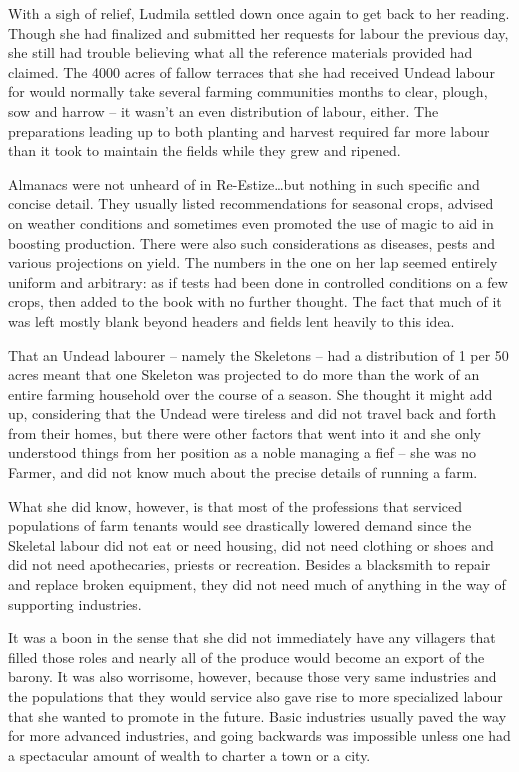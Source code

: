  

With a sigh of relief, Ludmila settled down once again to get back to her reading. Though she had finalized and submitted her requests for labour the previous day, she still had trouble believing what all the reference materials provided had claimed. The 4000 acres of fallow terraces that she had received Undead labour for would normally take several farming communities months to clear, plough, sow and harrow – it wasn’t an even distribution of labour, either. The preparations leading up to both planting and harvest required far more labour than it took to maintain the fields while they grew and ripened.

 

Almanacs were not unheard of in Re-Estize…but nothing in such specific and concise detail. They usually listed recommendations for seasonal crops, advised on weather conditions and sometimes even promoted the use of magic to aid in boosting production. There were also such considerations as diseases, pests and various projections on yield. The numbers in the one on her lap seemed entirely uniform and arbitrary: as if tests had been done in controlled conditions on a few crops, then added to the book with no further thought. The fact that much of it was left mostly blank beyond headers and fields lent heavily to this idea.

 

That an Undead labourer – namely the Skeletons – had a distribution of 1 per 50 acres meant that one Skeleton was projected to do more than the work of an entire farming household over the course of a season. She thought it might add up, considering that the Undead were tireless and did not travel back and forth from their homes, but there were other factors that went into it and she only understood things from her position as a noble managing a fief – she was no Farmer, and did not know much about the precise details of running a farm.

 

What she did know, however, is that most of the professions that serviced populations of farm tenants would see drastically lowered demand since the Skeletal labour did not eat or need housing, did not need clothing or shoes and did not need apothecaries, priests or recreation. Besides a blacksmith to repair and replace broken equipment, they did not need much of anything in the way of supporting industries.

 

It was a boon in the sense that she did not immediately have any villagers that filled those roles and nearly all of the produce would become an export of the barony. It was also worrisome, however, because those very same industries and the populations that they would service also gave rise to more specialized labour that she wanted to promote in the future. Basic industries usually paved the way for more advanced industries, and going backwards was impossible unless one had a spectacular amount of wealth to charter a town or a city.

